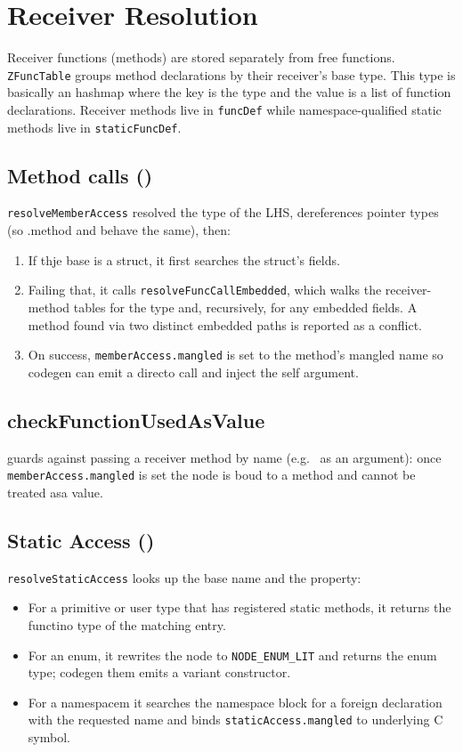 \section{Receiver Resolution}

Receiver functions (methods) are stored separately from free functions. \texttt{ZFuncTable} groups method declarations by their receiver's base type. This type is basically an hashmap where the key is the type and the value is a list of function declarations. Receiver methods live in \texttt{funcDef} while namespace-qualified static methods live in \texttt{staticFuncDef}.

\subsection{Method calls ()}

\texttt{resolveMemberAccess} resolved the type of the LHS, dereferences pointer types (so .method and  behave the same), then:
\begin{enumerate}
    \item If thje base is a struct, it first searches the struct's fields.
    \item Failing that, it calls \texttt{resolveFuncCallEmbedded}, which walks the receiver-method tables for the type and, recursively, for any embedded fields. A method found via two distinct embedded paths is reported as a conflict.
    \item On success, \texttt{memberAccess.mangled} is set to the method's mangled name so codegen can emit a directo call and inject the self argument.
\end{enumerate}

\subsection{checkFunctionUsedAsValue} guards against passing a receiver method by name (e.g. \ as an argument): once \texttt{memberAccess.mangled} is set the node is boud to a method and cannot be treated asa value.

\subsection{Static Access ()}

\texttt{resolveStaticAccess} looks up the base name and the property:
\begin{itemize}
    \item For a primitive or user type that has registered static methods, it returns the functino type of the matching entry.
    \item For an enum, it rewrites the node to \texttt{NODE\_ENUM\_LIT} and returns the enum type; codegen them emits a variant constructor.
    \item For a namespacem it searches the namespace block for a foreign declaration with the requested name and binds \texttt{staticAccess.mangled} to underlying C symbol.
\end{itemize}


